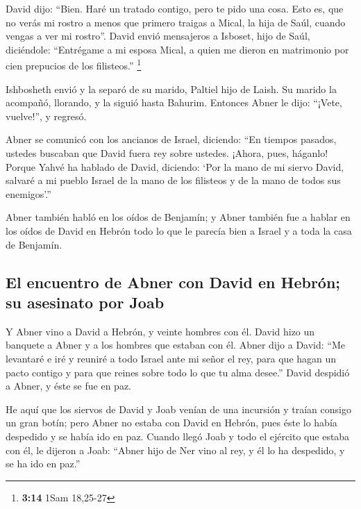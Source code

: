 \begin{paracol}{2}
 David dijo: ``Bien. Haré un tratado contigo, pero te
pido una cosa. Esto es, que no verás mi rostro a menos que primero
traigas a Mical, la hija de Saúl, cuando vengas a ver mi rostro''.
 David envió mensajeros a Isboset, hijo de Saúl,
diciéndole: ``Entrégame a mi esposa Mical, a quien me dieron en
matrimonio por cien prepucios de los filisteos.'' \footnote{\textbf{3:14}
  1Sam 18,25-27}

 Ishbosheth envió y la separó de su marido, Paltiel hijo
de Laish.  Su marido la acompañó, llorando, y la siguió
hasta Bahurim. Entonces Abner le dijo: ``¡Vete, vuelve!'', y regresó.

 Abner se comunicó con los ancianos de Israel, diciendo:
``En tiempos pasados, ustedes buscaban que David fuera rey sobre
ustedes.  ¡Ahora, pues, háganlo! Porque Yahvé ha hablado
de David, diciendo: `Por la mano de mi siervo David, salvaré a mi pueblo
Israel de la mano de los filisteos y de la mano de todos sus
enemigos'.''

 Abner también habló en los oídos de Benjamín; y Abner
también fue a hablar en los oídos de David en Hebrón todo lo que le
parecía bien a Israel y a toda la casa de Benjamín.

\hypertarget{el-encuentro-de-abner-con-david-en-hebruxf3n-su-asesinato-por-joab}{%
\subsection{El encuentro de Abner con David en Hebrón; su asesinato por
Joab}\label{el-encuentro-de-abner-con-david-en-hebruxf3n-su-asesinato-por-joab}}

 Y Abner vino a David a Hebrón, y veinte hombres con él.
David hizo un banquete a Abner y a los hombres que estaban con él.
 Abner dijo a David: ``Me levantaré e iré y reuniré a
todo Israel ante mi señor el rey, para que hagan un pacto contigo y para
que reines sobre todo lo que tu alma desee.'' David despidió a Abner, y
éste se fue en paz.

 He aquí que los siervos de David y Joab venían de una
incursión y traían consigo un gran botín; pero Abner no estaba con David
en Hebrón, pues éste lo había despedido y se había ido en paz.
 Cuando llegó Joab y todo el ejército que estaba con él,
le dijeron a Joab: ``Abner hijo de Ner vino al rey, y él lo ha
despedido, y se ha ido en paz.''


\end{paracol}
